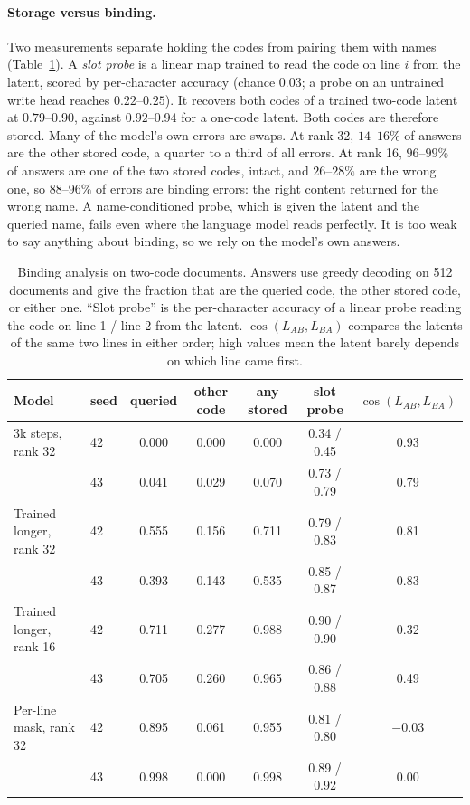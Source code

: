 \paragraph{Storage versus binding.} Two measurements separate holding the codes from pairing them with names (Table~\ref{tab:bindanalysis}). A \emph{slot probe} is a linear map trained to read the code on line $i$ from the latent, scored by per-character accuracy (chance $0.03$; a probe on an untrained write head reaches $0.22$--$0.25$). It recovers both codes of a trained two-code latent at $0.79$--$0.90$, against $0.92$--$0.94$ for a one-code latent. Both codes are therefore stored. Many of the model's own errors are swaps. At rank 32, $14$--$16\%$ of answers are the other stored code, a quarter to a third of all errors. At rank 16, $96$--$99\%$ of answers are one of the two stored codes, intact, and $26$--$28\%$ are the wrong one, so $88$--$96\%$ of errors are binding errors: the right content returned for the wrong name. A name-conditioned probe, which is given the latent and the queried name, fails even where the language model reads perfectly. It is too weak to say anything about binding, so we rely on the model's own answers.

\begin{table}[h]
\small\centering
\caption{Binding analysis on two-code documents. Answers use greedy decoding on 512 documents and give the fraction that are the queried code, the other stored code, or either one. ``Slot probe'' is the per-character accuracy of a linear probe reading the code on line 1 / line 2 from the latent. $\cos(L_{AB},L_{BA})$ compares the latents of the same two lines in either order; high values mean the latent barely depends on which line came first.}
\label{tab:bindanalysis}
\begin{tabular}{@{}llccccc@{}}
\toprule
\textbf{Model} & \textbf{seed} & \textbf{queried} & \textbf{other code} & \textbf{any stored} & \textbf{slot probe} & $\cos(L_{AB},L_{BA})$ \\
\midrule
3k steps, rank 32 & 42 & 0.000 & 0.000 & 0.000 & 0.34 / 0.45 & 0.93 \\
                  & 43 & 0.041 & 0.029 & 0.070 & 0.73 / 0.79 & 0.79 \\
Trained longer, rank 32 & 42 & 0.555 & 0.156 & 0.711 & 0.79 / 0.83 & 0.81 \\
                        & 43 & 0.393 & 0.143 & 0.535 & 0.85 / 0.87 & 0.83 \\
Trained longer, rank 16 & 42 & 0.711 & 0.277 & 0.988 & 0.90 / 0.90 & 0.32 \\
                        & 43 & 0.705 & 0.260 & 0.965 & 0.86 / 0.88 & 0.49 \\
Per-line mask, rank 32 & 42 & 0.895 & 0.061 & 0.955 & 0.81 / 0.80 & $-0.03$ \\
                       & 43 & 0.998 & 0.000 & 0.998 & 0.89 / 0.92 & $0.00$ \\
\bottomrule
\end{tabular}
\end{table}

